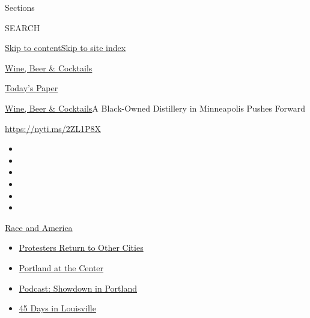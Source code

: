 Sections

SEARCH

\protect\hyperlink{site-content}{Skip to
content}\protect\hyperlink{site-index}{Skip to site index}

\href{https://www.nytimes3xbfgragh.onion/section/food/drinks}{Wine, Beer
\& Cocktails}

\href{https://myaccount.nytimes3xbfgragh.onion/auth/login?response_type=cookie\&client_id=vi}{}

\href{https://www.nytimes3xbfgragh.onion/section/todayspaper}{Today's
Paper}

\href{/section/food/drinks}{Wine, Beer \& Cocktails}\textbar{}A
Black-Owned Distillery in Minneapolis Pushes Forward

\url{https://nyti.ms/2ZL1P8X}

\begin{itemize}
\item
\item
\item
\item
\item
\item
\end{itemize}

\href{https://www.nytimes3xbfgragh.onion/news-event/george-floyd-protests-minneapolis-new-york-los-angeles?action=click\&pgtype=Article\&state=default\&region=TOP_BANNER\&context=storylines_menu}{Race
and America}

\begin{itemize}
\tightlist
\item
  \href{https://www.nytimes3xbfgragh.onion/2020/07/26/us/protests-portland-seattle-trump.html?action=click\&pgtype=Article\&state=default\&region=TOP_BANNER\&context=storylines_menu}{Protesters
  Return to Other Cities}
\item
  \href{https://www.nytimes3xbfgragh.onion/2020/07/24/us/portland-oregon-protests-white-race.html?action=click\&pgtype=Article\&state=default\&region=TOP_BANNER\&context=storylines_menu}{Portland
  at the Center}
\item
  \href{https://www.nytimes3xbfgragh.onion/2020/07/23/podcasts/the-daily/portland-protests.html?action=click\&pgtype=Article\&state=default\&region=TOP_BANNER\&context=storylines_menu}{Podcast:
  Showdown in Portland}
\item
  \href{https://www.nytimes3xbfgragh.onion/interactive/2020/07/16/us/black-lives-matter-protests-louisville-breonna-taylor.html?action=click\&pgtype=Article\&state=default\&region=TOP_BANNER\&context=storylines_menu}{45
  Days in Louisville}
\end{itemize}

